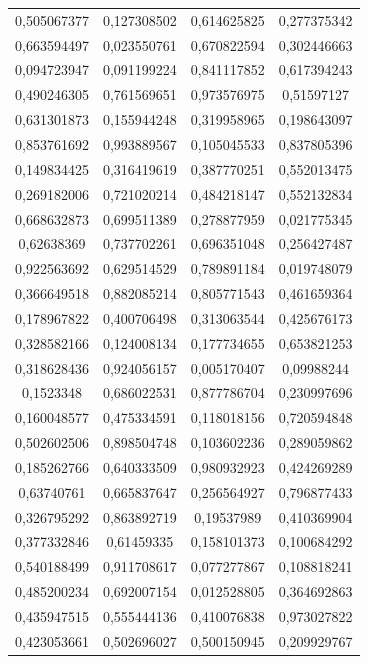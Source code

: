 \documentclass[a4paper, 12pt]{article}
\begin{document}
\begin{longtable}{|c|c|c|c|}
    0,505067377 & 0,127308502 & 0,614625825 & 0,277375342 \\
    0,663594497 & 0,023550761 & 0,670822594 & 0,302446663 \\
    0,094723947 & 0,091199224 & 0,841117852 & 0,617394243 \\
    0,490246305 & 0,761569651 & 0,973576975 & 0,51597127 \\
    0,631301873 & 0,155944248 & 0,319958965 & 0,198643097 \\
    0,853761692 & 0,993889567 & 0,105045533 & 0,837805396 \\
    0,149834425 & 0,316419619 & 0,387770251 & 0,552013475 \\
    0,269182006 & 0,721020214 & 0,484218147 & 0,552132834 \\
    0,668632873 & 0,699511389 & 0,278877959 & 0,021775345 \\
    0,62638369 & 0,737702261 & 0,696351048 & 0,256427487 \\
    0,922563692 & 0,629514529 & 0,789891184 & 0,019748079 \\
    0,366649518 & 0,882085214 & 0,805771543 & 0,461659364 \\
    0,178967822 & 0,400706498 & 0,313063544 & 0,425676173 \\
    0,328582166 & 0,124008134 & 0,177734655 & 0,653821253 \\
    0,318628436 & 0,924056157 & 0,005170407 & 0,09988244 \\
    0,1523348 & 0,686022531 & 0,877786704 & 0,230997696 \\
    0,160048577 & 0,475334591 & 0,118018156 & 0,720594848 \\
    0,502602506 & 0,898504748 & 0,103602236 & 0,289059862 \\
    0,185262766 & 0,640333509 & 0,980932923 & 0,424269289 \\
    0,63740761 & 0,665837647 & 0,256564927 & 0,796877433 \\
    0,326795292 & 0,863892719 & 0,19537989 & 0,410369904 \\
    0,377332846 & 0,61459335 & 0,158101373 & 0,100684292 \\
    0,540188499 & 0,911708617 & 0,077277867 & 0,108818241 \\
    0,485200234 & 0,692007154 & 0,012528805 & 0,364692863 \\
    0,435947515 & 0,555444136 & 0,410076838 & 0,973027822 \\
    0,423053661 & 0,502696027 & 0,500150945 & 0,209929767 \\

\end{longtable}
\end{document}
